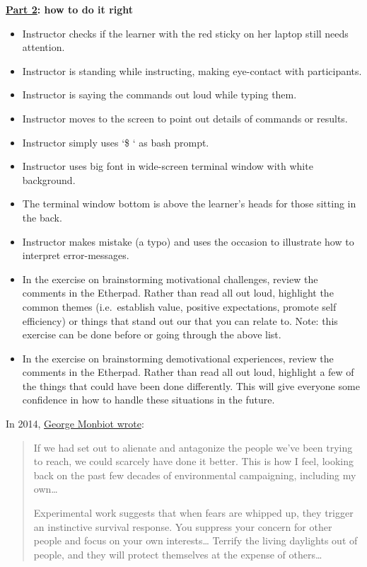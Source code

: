 \textbf{\href{https://youtu.be/SkPmwe\_WjeY}{Part 2}: how to do it right}

\begin{itemize}
\item
  Instructor checks if the learner with the red sticky on her laptop
  still needs attention.
\item
  Instructor is standing while instructing, making eye-contact with
  participants.
\item
  Instructor is saying the commands out loud while typing them.
\item
  Instructor moves to the screen to point out details of commands or
  results.
\item
  Instructor simply uses `\$ ` as bash prompt.
\item
  Instructor uses big font in wide-screen terminal window with white
  background.
\item
  The terminal window bottom is above the learner's heads for those
  sitting in the back.
\item
  Instructor makes mistake (a typo) and uses the occasion to illustrate
  how to interpret error-messages.
\end{itemize}


\begin{itemize}
\item
  In the exercise on brainstorming motivational challenges, review the
  comments in the Etherpad. Rather than read all out loud, highlight the
  common themes (i.e.~establish value, positive expectations, promote
  self efficiency) or things that stand out our that you can relate to.
  Note: this exercise can be done before or going through the above
  list.
\item
  In the exercise on brainstorming demotivational experiences, review
  the comments in the Etherpad. Rather than read all out loud, highlight
  a few of the things that could have been done differently. This will
  give everyone some confidence in how to handle these situations in the
  future.
\end{itemize}


In 2014,
\href{http://www.theguardian.com/commentisfree/2014/jun/16/saving-the-world-promise-not-fear-nature-environmentalism}{George
Monbiot wrote}:

\begin{quote}
If we had set out to alienate and antagonize the people we've been
trying to reach, we could scarcely have done it better. This is how I
feel, looking back on the past few decades of environmental campaigning,
including my own\ldots{}

Experimental work suggests that when fears are whipped up, they trigger
an instinctive survival response. You suppress your concern for other
people and focus on your own interests\ldots{} Terrify the living
daylights out of people, and they will protect themselves at the expense
of others\ldots{}
\end{quote}

